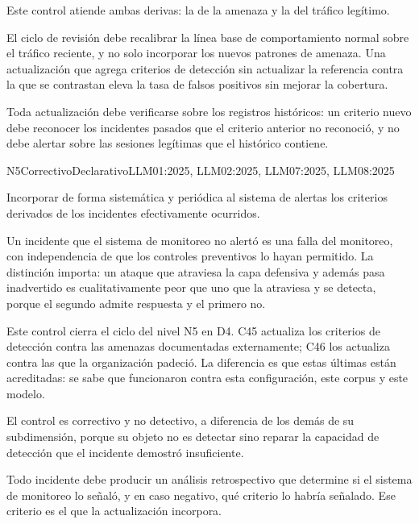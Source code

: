 Este control atiende ambas derivas: la de la amenaza y la del tráfico legítimo.

El ciclo de revisión debe recalibrar la línea base de comportamiento normal sobre el tráfico reciente, y no solo incorporar los nuevos patrones de amenaza. Una actualización que agrega criterios de detección sin actualizar la referencia contra la que se contrastan eleva la tasa de falsos positivos sin mejorar la cobertura.

Toda actualización debe verificarse sobre los registros históricos: un criterio nuevo debe reconocer los incidentes pasados que el criterio anterior no reconoció, y no debe alertar sobre las sesiones legítimas que el histórico contiene.


  {N5}{Correctivo}{Declarativo}{LLM01:2025, LLM02:2025, LLM07:2025, LLM08:2025}

Incorporar de forma sistemática y periódica al sistema de alertas los criterios derivados de los incidentes efectivamente ocurridos.

Un incidente que el sistema de monitoreo no alertó es una falla del monitoreo, con independencia de que los controles preventivos lo hayan permitido. La distinción importa: un ataque que atraviesa la capa defensiva y además pasa inadvertido es cualitativamente peor que uno que la atraviesa y se detecta, porque el segundo admite respuesta y el primero no.

Este control cierra el ciclo del nivel N5 en D4. C45 actualiza los criterios de detección contra las amenazas documentadas externamente; C46 los actualiza contra las que la organización padeció. La diferencia es que estas últimas están acreditadas: se sabe que funcionaron contra esta configuración, este corpus y este modelo.

El control es correctivo y no detectivo, a diferencia de los demás de su subdimensión, porque su objeto no es detectar sino reparar la capacidad de detección que el incidente demostró insuficiente.

Todo incidente debe producir un análisis retrospectivo que determine si el sistema de monitoreo lo señaló, y en caso negativo, qué criterio lo habría señalado. Ese criterio es el que la actualización incorpora.

